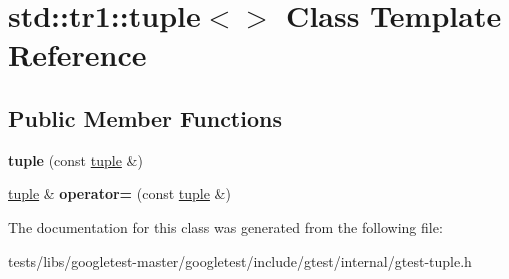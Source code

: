 \hypertarget{classstd_1_1tr1_1_1tuple_3_4}{}\section{std\+:\+:tr1\+:\+:tuple$<$$>$ Class Template Reference}
\label{classstd_1_1tr1_1_1tuple_3_4}
\subsection*{Public Member Functions}
\begin{DoxyCompactItemize}
\item 
\mbox{\label{classstd_1_1tr1_1_1tuple_3_4_aa857599acb126134e29dc5e53fd9d1a7}} 
{\bfseries tuple} (const \hyperlink{classstd_1_1tr1_1_1tuple}{tuple} \&)
\item 
\mbox{\label{classstd_1_1tr1_1_1tuple_3_4_a93ddab6f662662fc49635608619150c8}} 
\hyperlink{classstd_1_1tr1_1_1tuple}{tuple} \& {\bfseries operator=} (const \hyperlink{classstd_1_1tr1_1_1tuple}{tuple} \&)
\end{DoxyCompactItemize}


The documentation for this class was generated from the following file\+:\begin{DoxyCompactItemize}
\item 
tests/libs/googletest-\/master/googletest/include/gtest/internal/gtest-\/tuple.\+h\end{DoxyCompactItemize}

